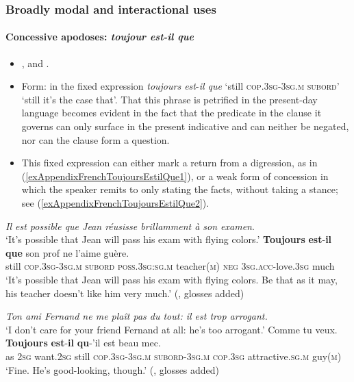 \subsubsection{Broadly modal and interactional uses}

\paragraph{Concessive apodoses: \textit{toujour est-il que}}\label{appendixFrenchToujoursConcessive}
\begin{itemize}
	\item \textcite{Fuchs1988}, \textcite[199–201]{MosegaardHansen2008} and  \textcite{Morel1996}.
	\item Form: in the fixed expression \textit{toujours est}-\textit{il que} \lq still \textsc{cop}.3\textsc{sg}-3\textsc{sg}.\textsc{m} \textsc{subord}\rq{ }\lq still it's the case that\rq{}. That this phrase is petrified in the present-day language becomes evident in the fact that the predicate in the clause it governs can only surface in the present indicative and can neither be negated, nor can the clause form a question.
	\item This fixed expression can either mark a return from a digression, as in (\ref{exAppendixFrenchToujoursEstilQue1}), or a weak form of concession in which the speaker remits to only stating the facts, without taking a stance; see (\ref{exAppendixFrenchToujoursEstilQue2}).
\end{itemize}
\begin{exe}
	\ex
	\textit{Il est possible que Jean réusisse brillamment à son examen}.\label{exAppendixFrenchToujoursEstilQue1}\\
	\lq It’s possible that Jean will pass his exam with flying colors.\rq
	\exi{}\gll \textbf{Toujours} \textbf{est}-\textbf{il} \textbf{que} son prof ne l’aime guère.\\
	 still \textsc{cop}.3\textsc{sg}-3\textsc{sg}.\textsc{m} \textsc{subord} \textsc{poss}.3\textsc{sg}:\textsc{sg}.\textsc{m} teacher(\textsc{m}) \textsc{neg} 3\textsc{sg}.\textsc{acc}-love.3\textsc{sg} much\\
	 \glt \lq It’s possible that Jean will pass his exam with flying colors. Be that as it may, his teacher doesn’t like him very much.\rq{ }(\cite[199]{MosegaardHansen2008}, glosses added)
	
	\ex\label{exAppendixFrenchToujoursEstilQue2}
	\begin{xlist}
		\textit{Ton ami Fernand ne me plaît pas du tout: il est trop arrogant.}\\
		\lq I don’t care for your friend Fernand at all: he’s too arrogant.\rq{}
		\gll  Comme tu veux. \textbf{Toujours} \textbf{est}-\textbf{il} \textbf{qu}-’il est beau mec.\\
		as 2\textsc{sg} want.2\textsc{sg} still \textsc{cop}.3\textsc{sg}-3\textsc{sg}.\textsc{m} \textsc{subord}-3\textsc{sg}.\textsc{m} \textsc{cop}.3\textsc{sg} attractive.\textsc{sg}.\textsc{m} guy(\textsc{m})\\
		\glt \lq Fine. He’s good-looking, though.\rq{ }(\cite[200]{MosegaardHansen2008}, glosses added)
	\end{xlist}
\end{exe}

